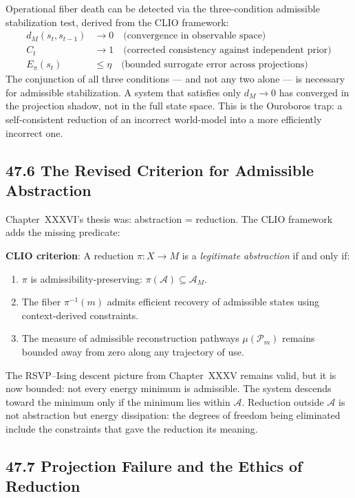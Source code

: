 \documentclass[12pt,letterpaper]{article}
\theoremstyle{remark}
\begin{document}
Operational fiber death can be detected via the three-condition
admissible stabilization test, derived from the CLIO framework:
\begin{align*}
d_M(s_t, s_{t-1}) &\to 0
\quad \text{(convergence in observable space)} \\
C_t &\to 1
\quad \text{(corrected consistency against independent prior)} \\
E_\pi(s_t) &\leq \eta
\quad \text{(bounded surrogate error across projections)}
\end{align*}
The conjunction of all three conditions — and not any two alone — is
necessary for admissible stabilization. A system that satisfies only
$d_M \to 0$ has converged in the projection shadow, not in the full
state space. This is the Ouroboros trap: a self-consistent reduction
of an incorrect world-model into a more efficiently incorrect one.

\subsection{47.6 The Revised Criterion for Admissible Abstraction}

Chapter~XXXVI's thesis was: abstraction = reduction. The CLIO
framework adds the missing predicate:

\begin{notebox}
\textbf{CLIO criterion}: A reduction $\pi: X \to M$ is a
\emph{legitimate abstraction} if and only if:
\begin{enumerate}
\item $\pi$ is admissibility-preserving: $\pi(\mathcal{A}) \subseteq \mathcal{A}_M$.
\item The fiber $\pi^{-1}(m)$ admits efficient recovery of
  admissible states using context-derived constraints.
\item The measure of admissible reconstruction pathways
  $\mu(\mathcal{P}_m)$ remains bounded away from zero along
  any trajectory of use.
\end{enumerate}
\end{notebox}

The RSVP--Ising descent picture from Chapter~XXXV remains valid,
but it is now bounded: not every energy minimum is admissible. The
system descends toward the minimum only if the minimum lies within
$\mathcal{A}$. Reduction outside $\mathcal{A}$ is not abstraction
but energy dissipation: the degrees of freedom being eliminated
include the constraints that gave the reduction its meaning.

\subsection{47.7 Projection Failure and the Ethics of Reduction}
\end{document}
